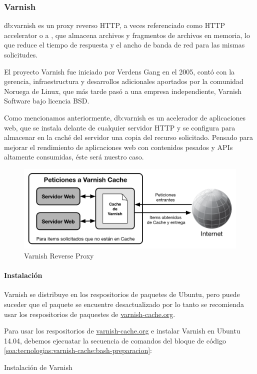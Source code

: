 \subsubsection{Varnish}
\label{soa:tecnologias:varnish}

\gls{db:varnish} es un proxy reverso HTTP, a veces referenciado como HTTP accelerator o a , que almacena archivos y fragmentos de archivos en memoria, lo que reduce el tiempo de respuesta y el ancho de banda de red para las mismas solicitudes.\cite[p.~20]{varnish2016}

El proyecto Varnish fue iniciado por Verdens Gang en el 2005, contó con la gerencia, infraestructura y desarrollos adicionales aportados por la comunidad Noruega de Linux, que más tarde pasó a una empresa independiente, Varnish Software bajo licencia BSD.

Como mencionamos anteriormente, \gls{db:varnish} es un acelerador de aplicaciones web, que se instala delante de cualquier servidor HTTP y se configura para almacenar en la caché del servidor una copia del recurso solicitado. Pensado para mejorar el rendimiento de aplicaciones web con contenidos pesados y APIs altamente consumidas, éste será nuestro caso.

\begin{figure}[H]
  \includegraphics[width=\linewidth]{src/images/03-capitulo-3/tecnologias/varnish/varnish-reverse-proxy.png}
  \caption{Varnish Reverse Proxy}
  \label{fig:varnish}
\end{figure}

\paragraph{Instalación}

Varnish se distribuye en los respositorios de paquetes de Ubuntu, pero puede suceder que el paquete se encuentre desactualizado por lo tanto se recomienda usar los respositorios de paquestes de \url{varnish-cache.org}.

Para usar los respositorios de \url{varnish-cache.org} e instalar Varnish en Ubuntu 14.04, debemos ejecuatar la secuencia de comandos del bloque de código \autoref{soa:tecnologias:varnish-cache:bash-preparacion}:

\begin{listing}[H]
  \caption{Instalación de Varnish}
  \label{soa:tecnologias:varnish-cache:bash-preparacion}
\end{listing}
